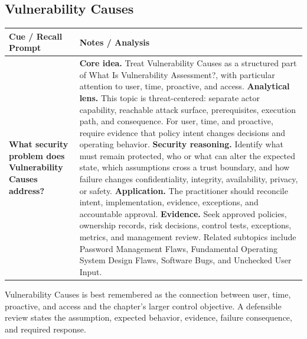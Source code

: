\documentclass[11pt]{article}
\newcommand{\CornellHeader}{%
\rowcolor{Navy}\color{white}\bfseries Cue / Recall Prompt & \color{white}\bfseries Notes / Analysis\\\hline}
\newcommand{\CornellRow}[2]{%
\cellcolor{CueGray}\RaggedRight\textbf{#1} & \RaggedRight #2\\\hline}
\begin{document}
\subsection*{Vulnerability Causes}
\begin{longtable}{>{\RaggedRight\arraybackslash}p{}|>{\RaggedRight\arraybackslash}p{}}
\CornellHeader
\CornellRow{What security problem does Vulnerability Causes address?}{\textbf{Core idea.} Treat Vulnerability Causes as a structured part of What Is Vulnerability Assessment?, with particular attention to user, time, proactive, and access. \textbf{Analytical lens.} This topic is threat-centered: separate actor capability, reachable attack surface, prerequisites, execution path, and consequence. For user, time, and proactive, require evidence that policy intent changes decisions and operating behavior. \textbf{Security reasoning.} Identify what must remain protected, who or what can alter the expected state, which assumptions cross a trust boundary, and how failure changes confidentiality, integrity, availability, privacy, or safety. \textbf{Application.} The practitioner should reconcile intent, implementation, evidence, exceptions, and accountable approval. \textbf{Evidence.} Seek approved policies, ownership records, risk decisions, control tests, exceptions, metrics, and management review. Related subtopics include Password Management Flaws, Fundamental Operating System Design Flaws, Software Bugs, and Unchecked User Input.}
\end{longtable}
\begin{topicsummary}
Vulnerability Causes is best remembered as the connection between user, time, proactive, and access and the chapter's larger control objective. A defensible review states the assumption, expected behavior, evidence, failure consequence, and required response.
\end{topicsummary}
\end{document}

